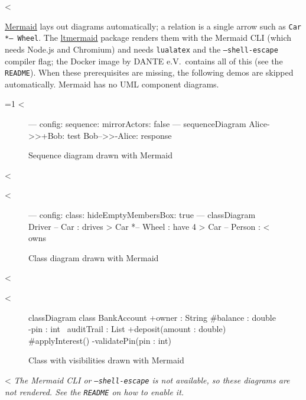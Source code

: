 <%

\href{https://mermaid.js.org}{Mermaid} lays out diagrams automatically; a relation is a single arrow such as \texttt{Car *-- Wheel}.
The \href{https://ctan.org/pkg/ltmermaid}{ltmermaid} package renders them with the Mermaid CLI (which needs Node.js and Chromium) and needs \texttt{lualatex} and the \texttt{--shell-escape} compiler flag; the Docker image by DANTE e.V.\ contains all of this (see the \texttt{README}).
When these prerequisites are missing, the following demos are skipped automatically.
Mermaid has no UML component diagrams.

\ifluatex
  \ifnum{}=1
    <%
    \begin{figure}
      \centering
      \begin{mermaid}
---
config:
  sequence:
    mirrorActors: false
---
sequenceDiagram
  Alice->>+Bob: test
  Bob-->>-Alice: response
\end{mermaid}
      \caption{Sequence diagram drawn with Mermaid}
      \label{fig:mermaid-sequence}
    \end{figure}
    <%

    <%
    \begin{figure}
      \centering
      \begin{mermaid}
---
config:
  class:
    hideEmptyMembersBox: true
---
classDiagram
  Driver -- Car : drives >
  Car *-- Wheel : have 4 >
  Car -- Person : < owns
\end{mermaid}
      \caption{Class diagram drawn with Mermaid}
      \label{fig:mermaid-class-relations}
    \end{figure}
    <%

    <%
    \begin{figure}
      \centering
      \begin{mermaid}
classDiagram
  class BankAccount {
    +owner : String
    #balance : double
    -pin : int
    ~auditTrail : List
    +deposit(amount : double)
    #applyInterest()
    -validatePin(pin : int)
  }
\end{mermaid}
      \caption{Class with visibilities drawn with Mermaid}
      \label{fig:mermaid-class-visibility}
    \end{figure}
    <%
  \else
    \emph{The Mermaid CLI or \texttt{--shell-escape} is not available, so these diagrams are not rendered. See the \texttt{README} on how to enable it.}
  \fi
\fi
